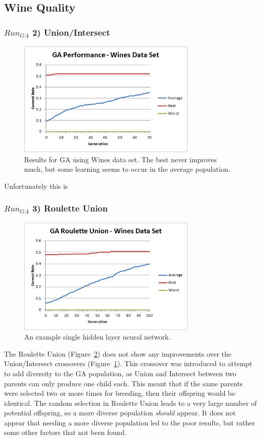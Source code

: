 \documentclass[journal]{IEEEtran}
\begin{document}
  \subsection{Wine Quality}
    \subsubsection*{$Run_{GA}$ 2) Union/Intersect}
      \begin{figure}[here]%
        \centering
        \includegraphics[width=3.4in]{wine_performance_new}
        \caption{Results for GA using Wines data set. The best never improves much, but some learning
        seems to occur in the average population.}
        \label{fig:wine_performance_new}
      \end{figure}

      Unfortunately this is

    \subsubsection*{$Run_{GA}$ 3) Roulette Union}
      \begin{figure}[here]%
        \centering
        \includegraphics[width=3.4in]{wine_uniform}
        \caption{An example single hidden layer neural network.}
        \label{fig:wine_uniform}
      \end{figure}
      The Roulette Union (Figure~\ref{fig:wine_uniform}) does not show any improvements over
      the Union/Intersect crossovers (Figure~\ref{fig:wine_performance_new}). This crossover
      was introduced to attempt to add diversity to the GA population, as Union and Intersect between two
      parents can only produce one child each. This meant that if the same parents were selected two or
      more times for breeding, then their offspring would be identical. The random selection in Roulette Union
      leads to a very large number of potential offspring, so a more diverse population \textit{should} appear.
      It does not appear that needing a more diverse population led to the poor results, but rather some other
      factors that not been found.
\end{document}
